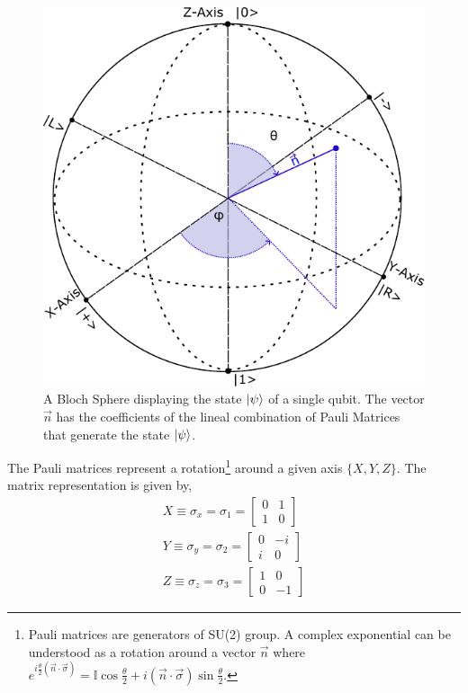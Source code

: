 \begin{figure}[h]
    \centering
    \includegraphics[scale=0.8]{Figures/BlochSphere_Layer 1.pdf}
    \caption{A Bloch Sphere displaying the state $\ket{\psi}$ of a single qubit. The vector $\vec{n}$ has the coefficients of the lineal combination of Pauli Matrices that generate the state $\ket{\psi}$.}
    \label{fig:bloch_sphere}
\end{figure}
The Pauli matrices represent a rotation\footnote{Pauli matrices are generators of SU(2) group. A complex exponential can be understood as a rotation around a vector $\vec{n}$ where $e^{i\frac{\theta}{2}(\vec{n}\cdot \vec{\sigma})} = \mathbb{I}\cos{\frac{\theta}{2}} + i(\vec{n}\cdot \vec{\sigma})\sin{\frac{\theta}{2}}$.} around a given axis $\{X, Y, Z \}$. The matrix representation is given by,
\begin{align*}
X \equiv \sigma_{x} = \sigma_{1} = 
    \begin{bmatrix}
           0 & 1 \\
           1 & 0 
         \end{bmatrix} \\
Y \equiv \sigma_{y} = \sigma_{2} = 
    \begin{bmatrix}
           0 & -i \\
           i & 0 
         \end{bmatrix} \\ 
Z \equiv \sigma_{z} = \sigma_{3} = 
    \begin{bmatrix}
           1 & 0 \\
           0 & -1 
         \end{bmatrix}
\end{align*}
